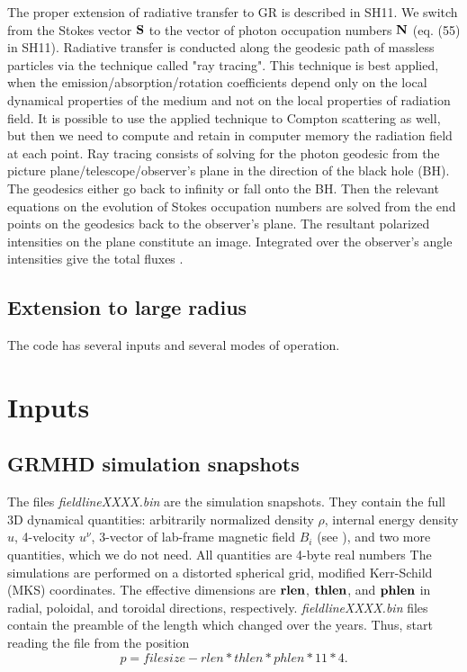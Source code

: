 \documentclass{emulateapj}
\begin{document}
The proper extension of radiative transfer to GR is described in SH11. We switch from the Stokes vector ${\bf S}$ to the vector of photon occupation numbers ${\bf N}$ (eq. (55) in SH11).
Radiative transfer is conducted along the geodesic path of massless particles via the technique called "ray tracing". This technique is best applied,
when the emission/absorption/rotation coefficients depend only on the local dynamical properties of the medium and not on the local properties of radiation field.
It is possible to use the applied technique to Compton scattering as well, but then we need to compute and retain in computer memory the radiation field at each point.
Ray tracing consists of solving for the photon geodesic from the picture plane/telescope/observer's plane in the direction of the black hole (BH).
The geodesics either go back to infinity or fall onto the BH. Then the relevant equations on the evolution of Stokes occupation numbers are solved from the end points
on the geodesics back to the observer's plane. The resultant polarized intensities on the plane constitute an image. Integrated over the observer's angle intensities
give the total fluxes \citep{Rybicki1979}.

\subsection{Extension to large radius}


The code has several inputs and several modes of operation.
\section{Inputs}
\subsection{GRMHD simulation snapshots}
The files \textit{fieldlineXXXX.bin} are the simulation snapshots. They contain the full 3D dynamical quantities: arbitrarily normalized density $\rho$, internal energy density $u$,
4-velocity $u^\nu$, 3-vector of lab-frame magnetic field $B_i$ (see \citealt{Penna:2010dj}), and two more quantities, which we do not need. All quantities are 4-byte real numbers
The simulations are performed on a distorted spherical grid, modified Kerr-Schild (MKS) coordinates. The effective dimensions are ${\bf rlen}$, ${\bf thlen}$, and ${\bf phlen}$
in radial, poloidal, and toroidal directions, respectively. \textit{fieldlineXXXX.bin} files contain the preamble of the length which changed over the years.
Thus, start reading the file from the position
\begin{equation}
p=filesize-rlen*thlen*phlen*11*4.
\end{equation}
\end{document}
